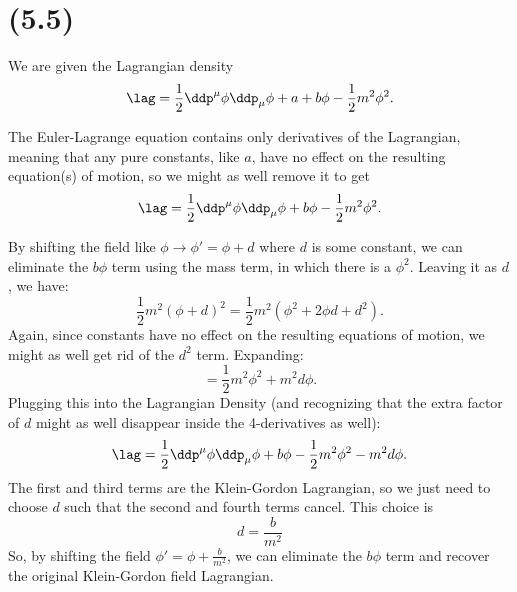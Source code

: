 \section{(5.5)}

We are given the Lagrangian density
\begin{equation}
    \lag = \frac{1}{2}\ddp^{\mu}\phi\ddp_{\mu}\phi + a + b\phi - \frac{1}{2}m^2\phi^2.
\end{equation}

\begin{parts}
\item The Euler-Lagrange equation contains only derivatives of the Lagrangian, meaning that any pure constants, like $a$, have no effect on the resulting equation(s) of motion, so we might as well remove it to get
\begin{equation}
    \lag = \frac{1}{2}\ddp^{\mu}\phi\ddp_{\mu}\phi + b\phi - \frac{1}{2}m^2\phi^2.
\end{equation}


\item By shifting the field like $\phi \rightarrow \phi' = \phi + d$ where $d$ is some constant, we can eliminate the $b\phi$ term using the mass term, in which there is a $\phi^2$. Leaving it as $d$, we have:
\begin{equation*}
    \frac{1}{2}m^2(\phi+d)^2 = \frac{1}{2}m^2(\phi^2 + 2\phi d + d^2).
\end{equation*}
Again, since constants have no effect on the resulting equations of motion, we might as well get rid of the $d^2$ term. Expanding:
\begin{equation*}
    = \frac{1}{2}m^2\phi^2 + m^2d\phi.
\end{equation*}
Plugging this into the Lagrangian Density (and recognizing that the extra factor of $d$ might as well disappear inside the 4-derivatives as well):
\begin{equation*}
    \lag = \frac{1}{2}\ddp^{\mu}\phi\ddp_{\mu}\phi + b\phi - \frac{1}{2}m^2\phi^2 - m^2d\phi.
\end{equation*}
The first and third terms are the Klein-Gordon Lagrangian, so we just need to choose $d$ such that the second and fourth terms cancel. This choice is
\begin{equation*}
    d = \frac{b}{m^2}
\end{equation*}
So, by shifting the field $\phi' = \phi + \frac{b}{m^2}$, we can eliminate the $b\phi$ term and recover the original Klein-Gordon field Lagrangian.

\end{parts}